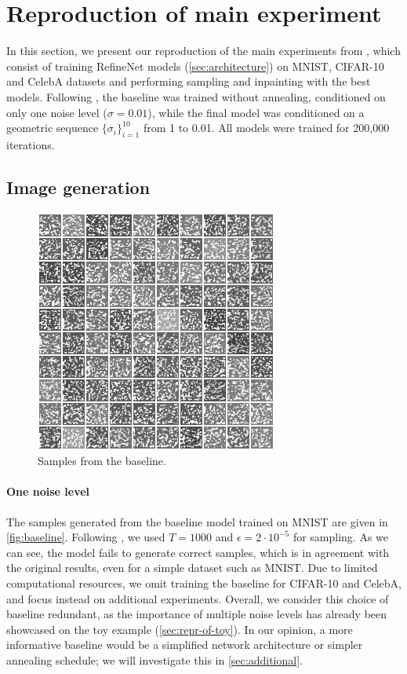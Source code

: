 
\section{Reproduction of main experiment}
\label{sec:main-exp}

In this section, we present our reproduction of the main experiments from \citep{ncsn-paper}, which consist of training RefineNet models (\autoref{sec:architecture}) on MNIST, CIFAR-10 and CelebA datasets and performing sampling and inpainting with the best models. Following \cite{ncsn-paper}, the baseline was trained without annealing, conditioned on only one noise level ($\sigma=0.01$), while the final model was conditioned on a geometric sequence $\{\sigma_i\}_{i = 1}^{10}$ from 1 to 0.01. All models were trained for 200,000 iterations. 

\subsection{Image generation}

\begin{figure}
    \centering
    \vspace{-2mm}
    \includegraphics[scale=0.38]{figures/samples/baseline.png}
    \caption{Samples from the baseline.}
    \label{fig:baseline}
    \vspace{-2mm}
\end{figure}

\paragraph{One noise level}
The samples generated from the baseline model trained on MNIST are given in \autoref{fig:baseline}. Following \cite{ncsn-paper}, we used $T=1000$ and $\epsilon=2 \cdot 10^{-5}$ for sampling. As we can see, the model fails to generate correct samples, which is in agreement with the original results, even for a simple dataset such as MNIST. Due to limited computational resources, we omit training the baseline for CIFAR-10 and CelebA, and focus instead on additional experiments. Overall, we consider this choice of baseline redundant, as the importance of multiple noise levels has already been showcased on the toy example (\autoref{sec:repr-of-toy}). In our opinion, a more informative baseline would be a simplified network architecture or simpler annealing schedule; we will investigate this in \autoref{sec:additional}.

